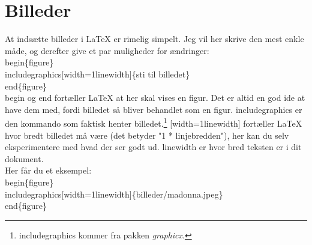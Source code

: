 
\chapter{Billeder}

At indsætte billeder i LaTeX er rimelig simpelt. Jeg vil her skrive den mest enkle måde, og derefter give et par muligheder for ændringer:\\

\indent \bs begin\{figure\}\\
\indent \bs includegraphics[width=1\bs linewidth]\{sti til billedet\}\\
\indent \bs end\{figure\}\\

\noindent
\bs begin og \bs end fortæller LaTeX at her skal vises en figur. Det er altid en god ide at have dem med, fordi billedet så bliver behandlet som en figur. \bs includegraphics er den kommando som faktisk henter billedet.\footnote{\bs includegraphics kommer fra pakken \emph{graphicx}.} [width=1\bs linewidth] fortæller LaTeX hvor bredt billedet må være (det betyder "1 * linjebredden"), her kan du selv eksperimentere med hvad der ser godt ud. \bs linewidth er hvor bred teksten er i dit dokument.\\
\noindent Her får du et eksempel:\\

\indent \bs begin\{figure\}\\
\indent \bs includegraphics[width=1\bs linewidth]\{billeder/madonna.jpeg\}\\
\indent \bs end\{figure\}\\

